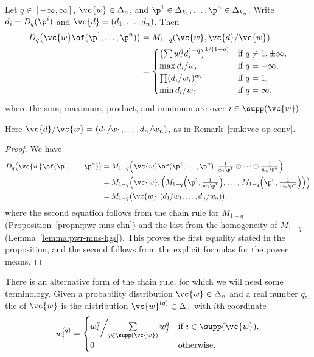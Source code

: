 \begin{propn}
%
%
% 
Let $q \in [-\infty, \infty]$, $\vc{w} \in \Delta_n$, and $\p^1 \in
\Delta_{k_1}, \ldots, \p^n \in \Delta_{k_n}$.  Write $d_i = D_q(\p^i)$ and
$\vc{d} = (d_1, \ldots, d_n)$.  Then
% 
\begin{align*}
D_q\bigl(\vc{w} \of (\p^1, \ldots, \p^n)\bigr)  &
=
M_{1 - q}(\vc{w}, \vc{d}/\vc{w})        \\
&
=
\begin{cases}
\bigl(\sum w_i^q d_i^{1 - q}\bigr)^{1/(1 - q)}    &
\text{if } q \neq 1, \pm\infty, \\
\max d_i/w_i    &
\text{if } q = -\infty, \\
\prod (d_i/w_i)^{w_i}   &
\text{if } q = 1,       \\
\min d_i/w_i    &
\text{if } q = \infty, 
\end{cases}
\end{align*}
% 
where the sum, maximum, product, and minimum are over $i \in
\supp(\vc{w})$. 
\end{propn}

Here $\vc{d}/\vc{w} = (d_1/w_1, \ldots, d_n/w_n)$, as in
Remark~\ref{rmk:vec-op-conv}. 

\begin{proof}
We have
% 
\begin{align*}
D_q\bigl(\vc{w} \of (\p^1, \ldots, \p^n)\bigr)  &
=
M_{1 - q}\Bigl(\vc{w} \of (\p^1, \ldots, \p^n), 
\tfrac{1}{w_1 \p^1} \oplus\cdots\oplus \tfrac{1}{w_n \p^n} \Bigr)       \\
&
=
M_{1 - q}\Bigl(\vc{w},
\Bigl( 
M_{1 - q}\Bigl(\p^1, \tfrac{1}{w_1 \p^1}\Bigr), \,\ldots,\,
M_{1 - q}\Bigl(\p^n, \tfrac{1}{w_n \p^n}\Bigl)    
\Bigr)
\Bigr) \\
&
=
M_{1 - q}\bigl( \vc{w}, (d_1/w_1, \ldots, d_n/w_n) \bigr),
\end{align*}
% 
where the second equation follows from the chain rule for $M_{1 - q}$
(Proposition~\ref{propn:pwr-mns-chn}) and the last from the homogeneity of $M_{1
- q}$ (Lemma~\ref{lemma:pwr-mns-hgs}).  This proves the first equality
stated in the proposition, and the second follows from the explicit
formulas for the power means.
\end{proof}

There is an alternative form of the chain rule, for which we will need some
terminology.  Given a probability distribution $\vc{w} \in \Delta_n$ and a
real number $q$, the
 of $\vc{w}$ is the distribution $\vc{w}^{(q)} \in \Delta_n$
with $i$th coordinate
\[
w^{(q)}_i
=
\begin{cases}
w_i^q \bigg/\!\!\sum\limits_{j \in \supp(\vc{w})} w_j^q &
\text{if } i \in \supp(\vc{w}),     \\
0       &
\text{otherwise}.
\end{cases}
\]

